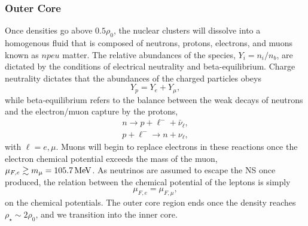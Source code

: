 \subsubsection*{Outer Core}
Once densities go above $0.5\rho_0$, the nuclear clusters will dissolve into a homogenous fluid that is composed of neutrons, protons, electrons, and muons known as $npeu$ matter. The relative abundances of the species, $Y_i=n_i/n_b$, are dictated by the conditions of electrical neutrality and beta-equilibrium.
Charge neutrality dictates that the abundances of the charged particles obeys
\begin{equation}
    Y_p = Y_e + Y_\mu,
\end{equation}
while beta-equilibrium refers to the balance between the weak decays of neutrons and the electron/muon capture by the protons,
\begin{gather}
    n \rightarrow p + \ell^- +\bar{\nu}_\ell,\label{eq:beta_decay}\\
    p + \ell^- \rightarrow n + \nu_\ell,\label{eq:electron_capture}
\end{gather}
with $\ell = e, \mu$. Muons will begin to replace electrons in these reactions once the electron chemical potential exceeds the mass of the muon, $\mu_{F,e} \gtrsim m_\mu = 105.7{\rm \,MeV}$. As neutrinos are assumed to escape the NS once produced, the relation between the chemical potential of the leptons is simply
\begin{equation}
    \mu_{F,e} = \mu_{F,\mu},
\end{equation}
on the chemical potentials. The outer core region ends once the density reaches $\rho_\star \sim 2\rho_0$, and we transition into the inner core.

